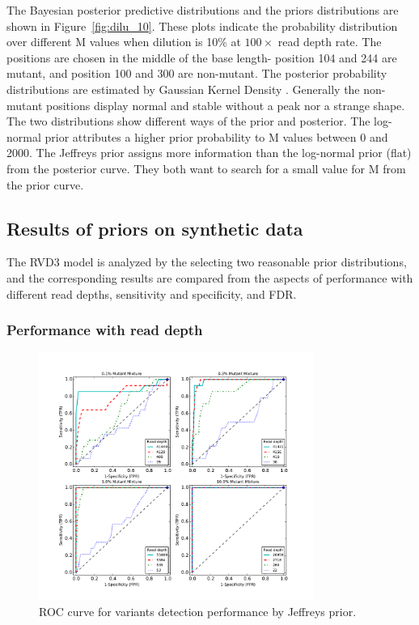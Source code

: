 \documentclass[11pt,reqno]{amsart}
\begin{document}
The Bayesian posterior predictive distributions and the priors distributions are shown in Figure~\ref{fig:dilu_10}.
These plots indicate the probability distribution over different M values when dilution is 10\% at $100\times$ read depth rate.
The positions are chosen in the middle of the base length- position 104 and 244 are mutant, and position 100 and 300 are non-mutant.
The posterior probability distributions are estimated by Gaussian Kernel Density \citep{silverman1986density}.
Generally the non-mutant positions display normal and stable without a peak nor a strange shape.
The two distributions show different ways of the prior and posterior.
The log-normal prior attributes a higher prior probability to M values between 0 and 2000.
The Jeffreys prior assigns more information than the log-normal prior (flat) from the posterior curve.
They both want to search for a small value for M from the prior curve.

\subsection{Results of priors on synthetic data}
The RVD3 model is analyzed by the selecting two reasonable prior distributions, and the corresponding results are compared from the aspects of performance with different read depths, sensitivity and specificity, and FDR.

\subsubsection{Performance with read depth}

\begin{figure}[htbp]
\begin{center}
\includegraphics[width=90mm]{figs/ROC_without_chi2_jeffrey.pdf}
\caption{ROC curve for variants detection performance by Jeffreys prior.}
\label{fig:ROC_jeffrey}
\end{center}
\end{figure}
\end{document}
